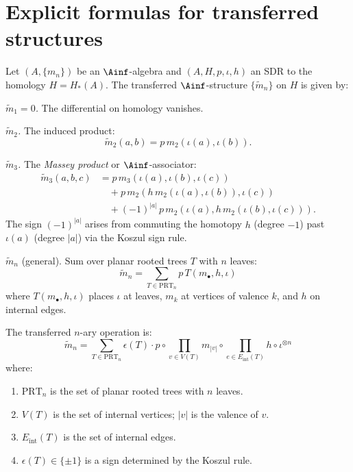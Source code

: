 \section{Explicit formulas for transferred structures}
\label{sec:transfer-formulas}

\begin{construction}
\label{constr:transfer-ainf}
Let $(A, \{m_n\})$ be an $\Ainf$-algebra and $(A, H, p, \iota, h)$ an SDR to
the homology $H = H_*(A)$. The transferred $\Ainf$-structure $\{\tilde{m}_n\}$
on $H$ is given by:

\emph{$\tilde{m}_1 = 0$.} The differential on homology vanishes.

\emph{$\tilde{m}_2$.} The induced product:
\[
\tilde{m}_2(a, b) = p \, m_2(\iota(a), \iota(b)).
\]

\emph{$\tilde{m}_3$.} The \emph{Massey product} or $\Ainf$-associator:
\begin{align*}
\tilde{m}_3(a, b, c) &= p \, m_3(\iota(a), \iota(b), \iota(c)) \\
&\quad + p \, m_2(h \, m_2(\iota(a), \iota(b)), \iota(c)) \\
&\quad + (-1)^{|a|}\, p \, m_2(\iota(a), h \, m_2(\iota(b), \iota(c))).
\end{align*}
The sign $(-1)^{|a|}$ arises from commuting the homotopy $h$ (degree $-1$) past $\iota(a)$ (degree $|a|$) via the Koszul sign rule.

\emph{$\tilde{m}_n$} (general). Sum over planar rooted trees $T$ with $n$
leaves:
\[
\tilde{m}_n = \sum_{T \in \mathrm{PRT}_n} p \, T(m_\bullet, h, \iota)
\]
where $T(m_\bullet, h, \iota)$ places $\iota$ at leaves, $m_k$ at vertices of
valence $k$, and $h$ on internal edges.
\end{construction}

\begin{theorem}
\label{thm:tree-formula}
The transferred $n$-ary operation is:
\[
\tilde{m}_n = \sum_{T \in \mathrm{PRT}_n} \epsilon(T) \cdot p \circ \prod_{v \in V(T)}
m_{|v|} \circ \prod_{e \in E_{\mathrm{int}}(T)} h \circ \iota^{\otimes n}
\]
where:
\begin{enumerate}[label=(\roman*)]
\item $\mathrm{PRT}_n$ is the set of planar rooted trees with $n$ leaves.
\item $V(T)$ is the set of internal vertices; $|v|$ is the valence of $v$.
\item $E_{\mathrm{int}}(T)$ is the set of internal edges.
\item $\epsilon(T) \in \{\pm 1\}$ is a sign determined by the Koszul rule.
\end{enumerate}
\end{theorem}

